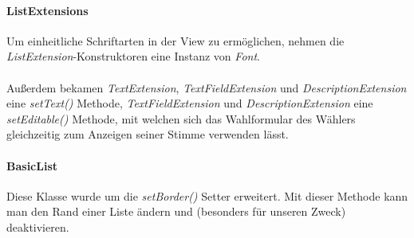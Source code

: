 \documentclass[parskip=full]{scrartcl}
\begin{document}
\paragraph{ListExtensions}
Um einheitliche Schriftarten in der View zu ermöglichen, nehmen die \textit{ListExtension}-Konstruktoren eine Instanz von \textit{Font}.
\\
\\
Außerdem bekamen \textit{TextExtension}, \textit{TextFieldExtension} und \textit{DescriptionExtension} eine \textit{setText()} Methode, \textit{TextFieldExtension} und \textit{DescriptionExtension} eine \textit{setEditable()} Methode, mit welchen sich das Wahlformular des Wählers gleichzeitig zum Anzeigen seiner Stimme verwenden lässt.

\paragraph{BasicList}
Diese Klasse wurde um die \textit{setBorder()} Setter erweitert. Mit dieser Methode kann man den Rand einer Liste ändern und (besonders für unseren Zweck) deaktivieren.


\end{document}
